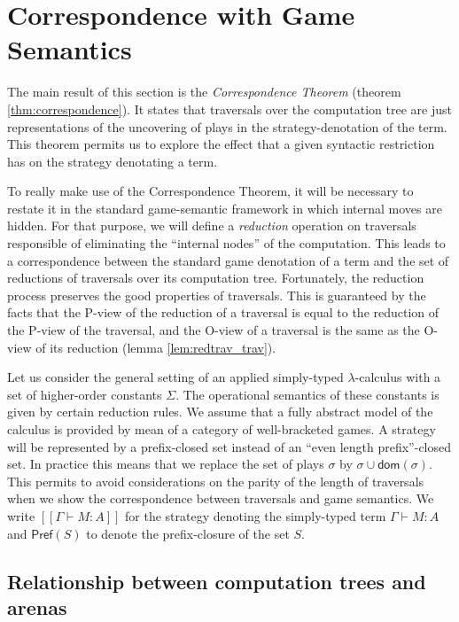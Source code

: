 \documentclass{llncs}
\newcommand{\lsem}{[\![} %
\newcommand{\rsem}{]\!]} %
\newcommand{\sem}[1]{{\lsem #1 \rsem}}
\newcommand\union{\cup}
\newcommand\prefset{\textsf{Pref}}
\begin{document}
\section{Correspondence with Game Semantics}
\label{sec:assumptions}

The main result of this section is the
\emph{Correspondence Theorem} (theorem \ref{thm:correspondence}). It
states that traversals over the computation tree are just
representations of the uncovering of plays in the
strategy-denotation of the term.  This theorem permits us 
to explore the effect that a given syntactic restriction has on the strategy denotating a term.

To really make use of the Correspondence Theorem, it will be
necessary to restate it in the standard game-semantic framework in
which internal moves are hidden. For that purpose, we will define a
\emph{reduction} operation on traversals responsible of eliminating
the ``internal nodes'' of the computation. This leads to a
correspondence between the standard game denotation of a term and
the set of reductions of traversals over its computation tree.
Fortunately, the reduction process preserves the good properties of
traversals. This is guaranteed by the facts that the P-view of the
reduction of a traversal is equal to the reduction of the P-view of
the traversal, and the O-view of a traversal is the same as the
O-view of its reduction (lemma \ref{lem:redtrav_trav}). \vspace{8pt}



Let us consider the general setting of an applied simply-typed $\lambda$-calculus with a set of higher-order constants $\Sigma$. The operational semantics of these constants is given by certain reduction rules.
We assume that a fully abstract model of the calculus is provided by mean of a category of well-bracketed games.
A strategy will be represented by a prefix-closed set instead of an ``even length
prefix''-closed set. In practice this means that we replace the set
of plays $\sigma$ by $\sigma \union \textsf{dom}(\sigma)$. This
permits to avoid considerations on the parity of the length of
traversals when we show the correspondence between traversals and
game semantics. We write $\sem{\Gamma \vdash M : A}$ for the strategy denoting the simply-typed term
$\Gamma \vdash M : A$ and $\prefset(S)$ to denote the
prefix-closure of the set $S$.


\subsection{Relationship between computation trees and arenas}
\end{document}
